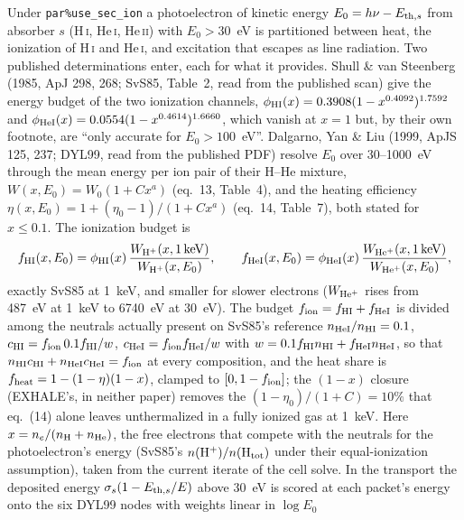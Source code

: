 \documentclass[english,a4paper]{my_memo}
\newcommand{\code}[1]{\texttt{#1}}
\begin{document}
Under \code{par\%use\_sec\_ion} a
photoelectron of kinetic energy $E_0 = h\nu - E_{{\rm th},s}$ from
absorber $s$ (H\,\textsc{i}, He\,\textsc{i}, He\,\textsc{ii}) with
$E_0 > 30$~eV is partitioned between heat, the ionization of H\,\textsc{i}
and He\,\textsc{i}, and excitation that escapes as line radiation.  Two
published determinations enter, each for what it provides.  Shull \& van
Steenberg (1985, ApJ 298, 268; SvS85, Table~2, read from the published
scan) give the energy budget of the two ionization channels,
$\phi_{\rm HI}(x) = 0.3908(1-x^{0.4092})^{1.7592}$ and
$\phi_{\rm HeI}(x) = 0.0554(1-x^{0.4614})^{1.6660}$, which vanish at
$x = 1$ but, by their own footnote, are ``only accurate for
$E_0 > 100$~eV''.  Dalgarno, Yan \& Liu (1999, ApJS 125, 237; DYL99,
read from the published PDF) resolve $E_0$ over 30--1000~eV through the
mean energy per ion pair of their H--He mixture,
$W(x,E_0) = W_0(1 + C x^a)$ (eq.~13, Table~4), and the heating
efficiency $\eta(x,E_0) = 1 + (\eta_0-1)/(1+Cx^a)$ (eq.~14, Table~7),
both stated for $x \le 0.1$.  The ionization budget is
\begin{equation}
  f_{\rm HI}(x,E_0) = \phi_{\rm HI}(x)\,
  \frac{W_{\rm H^+}(x,1\,{\rm keV})}{W_{\rm H^+}(x,E_0)},\qquad
  f_{\rm HeI}(x,E_0) = \phi_{\rm HeI}(x)\,
  \frac{W_{\rm He^+}(x,1\,{\rm keV})}{W_{\rm He^+}(x,E_0)},
\end{equation}
exactly SvS85 at 1~keV, and smaller for slower electrons ($W_{\rm He^+}$
rises from 487~eV at 1~keV to 6740~eV at 30~eV).  The budget
$f_{\rm ion} = f_{\rm HI} + f_{\rm HeI}$ is divided among the neutrals
actually present on SvS85's reference $n_{\rm HeI}/n_{\rm HI} = 0.1$,
$c_{\rm HI} = f_{\rm ion}\,0.1f_{\rm HI}/w$,
$c_{\rm HeI} = f_{\rm ion}f_{\rm HeI}/w$ with
$w = 0.1 f_{\rm HI}n_{\rm HI} + f_{\rm HeI}n_{\rm HeI}$, so that
$n_{\rm HI}c_{\rm HI} + n_{\rm HeI}c_{\rm HeI} = f_{\rm ion}$ at every
composition, and the heat share is
$f_{\rm heat} = 1 - (1-\eta)(1-x)$, clamped to $[0, 1-f_{\rm ion}]$; the
$(1-x)$ closure (EXHALE's, in neither paper) removes the
$(1-\eta_0)/(1+C) = 10\%$ that eq.~(14) alone leaves unthermalized in a
fully ionized gas at 1~keV.  Here $x = n_e/(n_{\rm H} + n_{\rm He})$, the
free electrons that compete with the neutrals for the photoelectron's
energy (SvS85's $n({\rm H^+})/n({\rm H_{tot}})$ under their
equal-ionization assumption), taken from the current iterate of the cell
solve.  In the transport the deposited energy
$\sigma_s(1-E_{{\rm th},s}/E)$ above 30~eV is scored at each packet's
energy onto the six DYL99 nodes with weights linear in $\log E_0$
\end{document}
